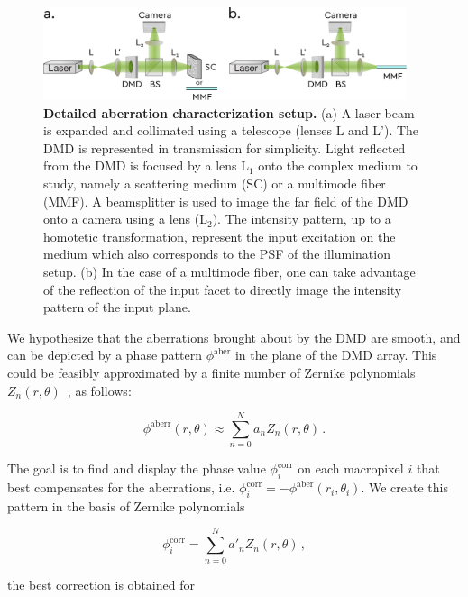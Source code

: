 \documentclass[12pt]{iopart}
\begin{document}
\begin{figure}
  \centering
  \includegraphics[width = 0.95\textwidth]{images/aberr_setup.pdf}
  \caption{
    \textbf{Detailed aberration characterization setup.}
    (a) A laser beam is expanded and collimated using a telescope (lenses L and L').
    The DMD is represented in transmission for simplicity.
    Light reflected from the DMD is focused by a lens L$_\text{1}$
    onto the complex medium to study, namely a scattering medium (SC)
    or a multimode fiber (MMF).
    A beamsplitter is used to image the far field of the DMD onto a camera
    using a lens (L$_\text{2}$).
    The intensity pattern, up to a homotetic transformation,
    represent the input excitation on the medium
    which also corresponds to the PSF of the illumination setup.
    (b) In the case of a multimode fiber,
    one can take advantage of the reflection of the input facet
    to directly image the intensity pattern of the input plane.
  }
  \label{fig:dmd_aberr_setup2}
\end{figure}

We hypothesize that the aberrations brought about by the DMD are smooth,
and can be depicted by a phase pattern $\phi^\text{aber}$ in the plane of the DMD array.
This could be feasibly approximated by a finite number of Zernike polynomials
$Z_n(r,\theta)$~\cite{Zernike1934beugungstheorie}, as follows:



\begin{equation}
  \phi^\text{aberr}(r,\theta) \approx \sum_{n=0}^N a_n Z_n(r,\theta) \, .
\end{equation}

The goal is to find and display the phase value
$\phi_i^\text{corr}$ on each macropixel $i$ that best compensates for the aberrations,
i.e. $\phi_i^\text{corr} = -\phi^\text{aber}(r_i,\theta_i)$.
We create this pattern in the basis of Zernike polynomials

\begin{equation}
  \phi_i^\text{corr} = \sum_{n=0}^N a'_n Z_n(r,\theta) \, ,
\end{equation}

\noindent the best correction is obtained for
\end{document}

